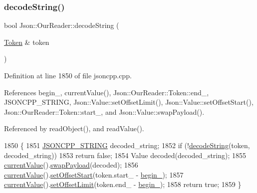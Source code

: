 \mbox{\label{class_json_1_1_our_reader_a34e31d8b8399b7ad493359702b6de6c9}} 
\subsubsection{\texorpdfstring{decode\+String()}{decodeString()}\hspace{0.1cm}{\footnotesize\ttfamily [1/2]}}
{\footnotesize\ttfamily bool Json\+::\+Our\+Reader\+::decode\+String (\begin{DoxyParamCaption}\item[{\hyperlink{class_json_1_1_our_reader_1_1_token}{Token} \&}]{token }\end{DoxyParamCaption})\hspace{0.3cm}{\ttfamily [private]}}



Definition at line 1850 of file jsoncpp.\+cpp.



References begin\+\_\+, current\+Value(), Json\+::\+Our\+Reader\+::\+Token\+::end\+\_\+, J\+S\+O\+N\+C\+P\+P\+\_\+\+S\+T\+R\+I\+NG, Json\+::\+Value\+::set\+Offset\+Limit(), Json\+::\+Value\+::set\+Offset\+Start(), Json\+::\+Our\+Reader\+::\+Token\+::start\+\_\+, and Json\+::\+Value\+::swap\+Payload().



Referenced by read\+Object(), and read\+Value().


\begin{DoxyCode}
1850                                          \{
1851   \hyperlink{json_8h_a1e723f95759de062585bc4a8fd3fa4be}{JSONCPP\_STRING} decoded\_string;
1852   \textcolor{keywordflow}{if} (!\hyperlink{class_json_1_1_our_reader_a34e31d8b8399b7ad493359702b6de6c9}{decodeString}(token, decoded\_string))
1853     \textcolor{keywordflow}{return} \textcolor{keyword}{false};
1854   Value decoded(decoded\_string);
1855   \hyperlink{class_json_1_1_our_reader_a2acd5b1d53e7d7e17c21ff8e96edc09d}{currentValue}().\hyperlink{class_json_1_1_value_a5263476047f20e2fc6de470e4de34fe5}{swapPayload}(decoded);
1856   \hyperlink{class_json_1_1_our_reader_a2acd5b1d53e7d7e17c21ff8e96edc09d}{currentValue}().\hyperlink{class_json_1_1_value_a92e32ea0f4f8a15853a3cf0beac9feb9}{setOffsetStart}(token.start\_ - \hyperlink{class_json_1_1_our_reader_a9bda9d72335d52cd06e65f9eca3f70f5}{begin\_});
1857   \hyperlink{class_json_1_1_our_reader_a2acd5b1d53e7d7e17c21ff8e96edc09d}{currentValue}().\hyperlink{class_json_1_1_value_a5e4f5853fec138150c5df6004a8c2bcf}{setOffsetLimit}(token.end\_ - \hyperlink{class_json_1_1_our_reader_a9bda9d72335d52cd06e65f9eca3f70f5}{begin\_});
1858   \textcolor{keywordflow}{return} \textcolor{keyword}{true};
1859 \}
\end{DoxyCode}
\mbox{\label{class_json_1_1_our_reader_a5046dfa5d43b1770a091aac0a63a9f4b}} 
